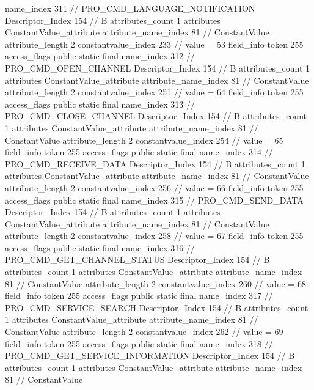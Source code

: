 {{{{{				name_index	311		// PRO_CMD_LANGUAGE_NOTIFICATION
				Descriptor_Index	154		// B
				attributes_count	1
				attributes {
				ConstantValue_attribute {
					attribute_name_index	81		// ConstantValue
					attribute_length	2
					constantvalue_index	233		// value = 53
				}
				}
			}
			field_info {
				token	255
				access_flags	public static final
				name_index	312		// PRO_CMD_OPEN_CHANNEL
				Descriptor_Index	154		// B
				attributes_count	1
				attributes {
				ConstantValue_attribute {
					attribute_name_index	81		// ConstantValue
					attribute_length	2
					constantvalue_index	251		// value = 64
				}
				}
			}
			field_info {
				token	255
				access_flags	public static final
				name_index	313		// PRO_CMD_CLOSE_CHANNEL
				Descriptor_Index	154		// B
				attributes_count	1
				attributes {
				ConstantValue_attribute {
					attribute_name_index	81		// ConstantValue
					attribute_length	2
					constantvalue_index	254		// value = 65
				}
				}
			}
			field_info {
				token	255
				access_flags	public static final
				name_index	314		// PRO_CMD_RECEIVE_DATA
				Descriptor_Index	154		// B
				attributes_count	1
				attributes {
				ConstantValue_attribute {
					attribute_name_index	81		// ConstantValue
					attribute_length	2
					constantvalue_index	256		// value = 66
				}
				}
			}
			field_info {
				token	255
				access_flags	public static final
				name_index	315		// PRO_CMD_SEND_DATA
				Descriptor_Index	154		// B
				attributes_count	1
				attributes {
				ConstantValue_attribute {
					attribute_name_index	81		// ConstantValue
					attribute_length	2
					constantvalue_index	258		// value = 67
				}
				}
			}
			field_info {
				token	255
				access_flags	public static final
				name_index	316		// PRO_CMD_GET_CHANNEL_STATUS
				Descriptor_Index	154		// B
				attributes_count	1
				attributes {
				ConstantValue_attribute {
					attribute_name_index	81		// ConstantValue
					attribute_length	2
					constantvalue_index	260		// value = 68
				}
				}
			}
			field_info {
				token	255
				access_flags	public static final
				name_index	317		// PRO_CMD_SERVICE_SEARCH
				Descriptor_Index	154		// B
				attributes_count	1
				attributes {
				ConstantValue_attribute {
					attribute_name_index	81		// ConstantValue
					attribute_length	2
					constantvalue_index	262		// value = 69
				}
				}
			}
			field_info {
				token	255
				access_flags	public static final
				name_index	318		// PRO_CMD_GET_SERVICE_INFORMATION
				Descriptor_Index	154		// B
				attributes_count	1
				attributes {
				ConstantValue_attribute {
					attribute_name_index	81		// ConstantValue
}}}}}}}
